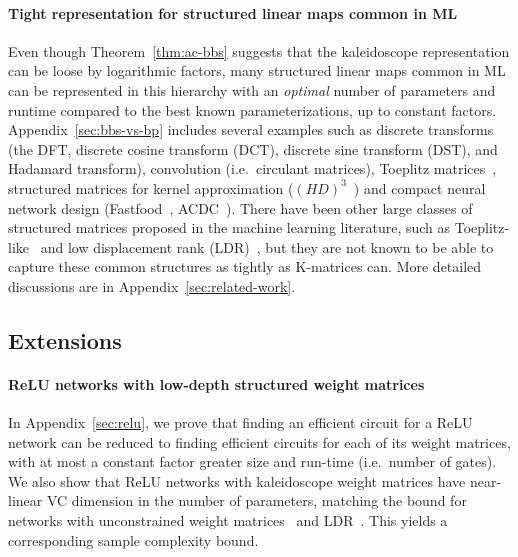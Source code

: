 \paragraph{Tight representation for structured linear maps common in ML} Even though Theorem~\ref{thm:ac-bbs} suggests that the kaleidoscope representation can be loose by logarithmic factors, many structured linear maps common in ML can be represented in this hierarchy with an
\emph{optimal} number of parameters and runtime compared to the best known parameterizations, up to constant factors.
Appendix~\ref{sec:bbs-vs-bp} includes several examples such as discrete transforms (the DFT, discrete cosine transform (DCT), discrete sine transform (DST), and Hadamard transform), convolution (i.e.\ circulant matrices), Toeplitz matrices~\citep{gray2006toeplitz}, structured matrices for kernel approximation ($(HD)^3$~\citep{yu2016orthogonal}) and compact neural network design (Fastfood~\citep{le2013fastfood}, ACDC~\citep{moczulski2015acdc}). There have been other large classes of structured matrices proposed in the machine learning literature, such as Toeplitz-like~\citep{sindhwani2015structured} and low displacement rank (LDR)~\citep{thomas2018learning}, but they are not known to be able to capture these common structures as tightly as K-matrices can. More detailed discussions are in Appendix~\ref{sec:related-work}.


\subsection{Extensions}
\label{sec:extension}
\paragraph{ReLU networks with low-depth structured weight matrices} In
Appendix~\ref{sec:relu}, we prove that finding an efficient circuit for a ReLU network can be reduced to finding efficient circuits for each of its weight matrices, with at most a constant factor greater size and run-time
(i.e.\ number of gates). We also show that ReLU networks with kaleidoscope weight matrices have near-linear VC dimension in the number of parameters, matching the bound for networks with unconstrained weight matrices~\citep{bartlett1999almost,
  bartlett2017nearly} and LDR~\citep{thomas2018learning}. This yields a corresponding sample complexity bound.


